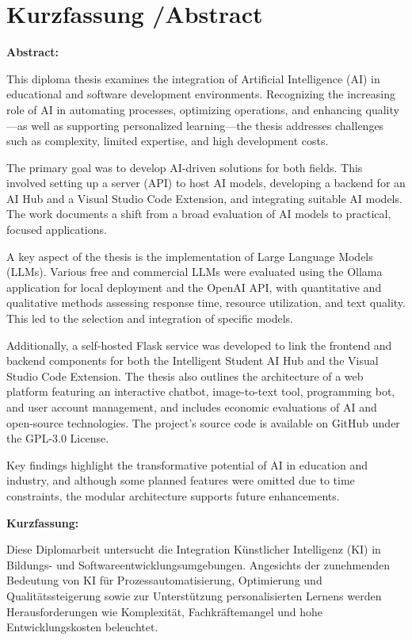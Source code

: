 

\small{\chapter*{Kurzfassung /Abstract }}
\label{cha:abstract}

\small{
\textbf{Abstract:}

This diploma thesis examines the integration of Artificial Intelligence (AI) in educational and software development environments. Recognizing the increasing role of AI in automating processes, optimizing operations, and enhancing quality—as well as supporting personalized learning—the thesis addresses challenges such as complexity, limited expertise, and high development costs.
    
The primary goal was to develop AI-driven solutions for both fields. This involved setting up a server (API) to host AI models, developing a backend for an AI Hub and a Visual Studio Code Extension, and integrating suitable AI models. The work documents a shift from a broad evaluation of AI models to practical, focused applications.
    
A key aspect of the thesis is the implementation of Large Language Models (LLMs). Various free and commercial LLMs were evaluated using the Ollama application for local deployment and the OpenAI API, with quantitative and qualitative methods assessing response time, resource utilization, and text quality. This led to the selection and integration of specific models.
    
Additionally, a self-hosted Flask service was developed to link the frontend and backend components for both the Intelligent Student AI Hub and the Visual Studio Code Extension. The thesis also outlines the architecture of a web platform featuring an interactive chatbot, image-to-text tool, programming bot, and user account management, and includes economic evaluations of AI and open-source technologies. The project’s source code is available on GitHub under the GPL-3.0 License.
    
Key findings highlight the transformative potential of AI in education and industry, and although some planned features were omitted due to time constraints, the modular architecture supports future enhancements.

\newpage

\textbf{Kurzfassung:}
    
Diese Diplomarbeit untersucht die Integration Künstlicher Intelligenz (KI) in Bildungs- und Softwareentwicklungsumgebungen. Angesichts der zunehmenden Bedeutung von KI für Prozessautomatisierung, Optimierung und Qualitätssteigerung sowie zur Unterstützung personalisierten Lernens werden Herausforderungen wie Komplexität, Fachkräftemangel und hohe Entwicklungskosten beleuchtet.
    
}
